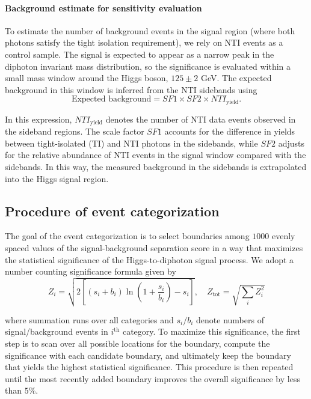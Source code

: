\documentclass[aps,prd,reprint,superscriptaddress]{revtex4-2}
\begin{document}
\paragraph{Background estimate for sensitivity evaluation}  

To estimate the number of background events in the signal region (where both photons satisfy the tight isolation requirement), we rely on NTI events as a control sample. The signal is expected to appear as a narrow peak in the diphoton invariant mass distribution, so the significance is evaluated within a small mass window around the Higgs boson, $125 \pm 2$ GeV. The expected background in this window is inferred from the NTI sidebands using
\[
\text{Expected background} = SF1 \times SF2 \times NTI_{\text{yield}} .
\]  

In this expression, $NTI_{\text{yield}}$ denotes the number of NTI data events observed in the sideband regions. The scale factor $SF1$ accounts for the difference in yields between tight-isolated (TI) and NTI photons in the sidebands, while $SF2$ adjusts for the relative abundance of NTI events in the signal window compared with the sidebands. In this way, the measured background in the sidebands is extrapolated into the Higgs signal region. 



\subsection{Procedure of event categorization}
The goal of the event categorization is to select boundaries among $1000$ evenly spaced values of the signal-background separation score in a way that maximizes the statistical significance of the Higgs-to-diphoton signal process. We adopt a number counting significance formula given by
\[{\textstyle Z_i = \sqrt{2\left[(s_i + b_i)\ln{\left(1+\frac{s_i}{b_i}\right)}-s_i\right]}, \quad Z_{\text{tot}} = \sqrt{\sum_i Z_i^2}}\]

where summation runs over all categories and \(s_i/b_i\) denote numbers of signal/background events in \(i^{\text{th}}\) category. To maximize this significance, the first step is to scan over all possible locations for the boundary, compute the significance with each candidate boundary, and ultimately keep the boundary that yields the highest statistical significance. This procedure is then repeated until the most recently added boundary improves the overall significance by less than $5\%$.
\end{document}
